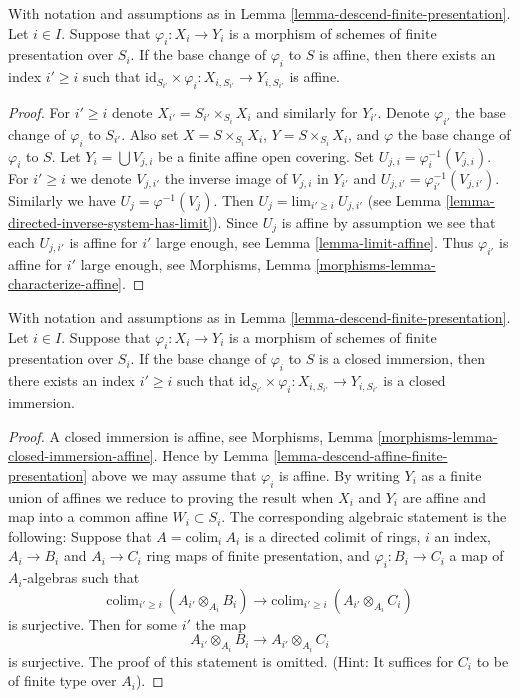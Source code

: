 \begin{lemma}
\label{lemma-descend-affine-finite-presentation}
With notation and assumptions as in
Lemma \ref{lemma-descend-finite-presentation}.
Let $i \in I$.
Suppose that $\varphi_i : X_i \to Y_i$ is a morphism of schemes
of finite presentation over $S_i$.
If the base change of $\varphi_i$ to $S$ is affine,
then there exists an index $i' \geq i$ such that
$\text{id}_{S_{i'}} \times \varphi_i : X_{i, S_{i'}} \to Y_{i, S_{i'}}$
is affine.
\end{lemma}

\begin{proof}
For $i' \geq i$ denote $X_{i'} = S_{i'} \times_{S_i} X_i$ and similarly
for $Y_{i'}$. Denote $\varphi_{i'}$ the base change of $\varphi_i$ to
$S_{i'}$. Also set $X = S \times_{S_i} X_i$, $Y =S \times_{S_i} X_i$,
and $\varphi$ the base change of $\varphi_i$ to $S$.
Let $Y_i = \bigcup V_{j, i}$ be a finite affine open covering.
Set $U_{j, i} = \varphi_i^{-1}(V_{j, i})$. For $i' \geq i$ we denote
$V_{j, i'}$ the inverse image of $V_{j, i}$ in $Y_{i'}$ and
$U_{j, i'} = \varphi_{i'}^{-1}(V_{j, i'})$. Similarly we have
$U_j = \varphi^{-1}(V_j)$. Then $U_j = \text{lim}_{i' \geq i}\ U_{j, i'}$
(see Lemma \ref{lemma-directed-inverse-system-has-limit}).
Since $U_j$ is affine by assumption we see that
each $U_{j, i'}$ is affine for $i'$ large enough, see
Lemma \ref{lemma-limit-affine}. Thus $\varphi_{i'}$ is
affine for $i'$ large enough, see
Morphisms, Lemma \ref{morphisms-lemma-characterize-affine}.
\end{proof}

\begin{lemma}
\label{lemma-descend-closed-immersion-finite-presentation}
With notation and assumptions as in
Lemma \ref{lemma-descend-finite-presentation}.
Let $i \in I$.
Suppose that $\varphi_i : X_i \to Y_i$ is a morphism of schemes
of finite presentation over $S_i$.
If the base change of $\varphi_i$ to $S$ is a closed immersion,
then there exists an index $i' \geq i$ such that
$\text{id}_{S_{i'}} \times \varphi_i : X_{i, S_{i'}} \to Y_{i, S_{i'}}$
is a closed immersion.
\end{lemma}

\begin{proof}
A closed immersion is affine, see
Morphisms, Lemma \ref{morphisms-lemma-closed-immersion-affine}.
Hence by Lemma \ref{lemma-descend-affine-finite-presentation} above
we may assume that $\varphi_i$ is affine.
By writing $Y_i$ as a finite union of affines we reduce to proving
the result when $X_i$ and $Y_i$ are affine and map
into a common affine $W_i \subset S_i$. The corresponding algebraic
statement is the following: Suppose that $A = \text{colim}_i\ A_i$
is a directed colimit of rings, $i$ an index, $A_i \to B_i$
and $A_i \to C_i$ ring maps of finite presentation, and
$\varphi_i : B_i \to C_i$ a map of $A_i$-algebras such that
$$
\text{colim}_{i' \geq i}\ (A_{i'} \otimes_{A_i} B_i)
\longrightarrow
\text{colim}_{i' \geq i}\ (A_{i'} \otimes_{A_i} C_i)
$$
is surjective. Then for some $i'$ the map
$$
A_{i'} \otimes_{A_i} B_i
\longrightarrow
A_{i'} \otimes_{A_i} C_i
$$
is surjective. The proof of this statement is omitted. (Hint: It
suffices for $C_i$ to be of finite type over $A_i$).
\end{proof}

